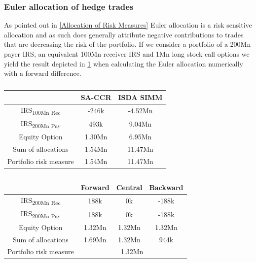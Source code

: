 \documentclass[../Thesis_AHoecherl.tex]{subfiles}
\begin{document}
    \subsubsection{Euler allocation of hedge trades}

    As pointed out in \ref{Allocation of Risk Measures} Euler allocation is a risk sensitive allocation and as such does generally attribute negative contributions to trades that are decreasing the risk of the portfolio. If we consider a portfolio of a 200Mn payer IRS, an equivalent 100Mn receiver IRS and 1Mn long stock call options we yield the result depicted in \ref{tab:hedge trade sample results} when calculating the Euler allocation numerically with a forward difference.

    \begin{table}[htbp]
        \label{tab:hedge trade sample results}
        \centering
            \begin{tabular}{c|c|c}
                & SA-CCR & ISDA SIMM \\
                \toprule
                IRS\textsubscript{100Mn Rec} & -246k & -4.52Mn \\
                \midrule
                IRS\textsubscript{200Mn Pay} & 493k & 9.04Mn \\
                \midrule
                Equity Option & 1.30Mn & 6.95Mn \\
                \bottomrule
                Sum of allocations & 1.54Mn & 11.47Mn \\
                \midrule
                Portfolio risk measure & 1.54Mn & 11.47Mn \\
            \end{tabular}%
        \caption{}
    \end{table}

    \begin{table}[htbp]
        \label{tab:EAD perfect hedge}
        \centering
            \begin{tabular}{c|c|c|c}
                & Forward & Central & Backward \\
                \toprule
                IRS\textsubscript{200Mn Rec} & 188k & 0k & -188k \\
                \midrule
                IRS\textsubscript{200Mn Pay} & 188k & 0k & -188k\\
                \midrule
                Equity Option & 1.32Mn & 1.32Mn & 1.32Mn\\
                \bottomrule
                Sum of allocations & 1.69Mn & 1.32Mn & 944k \\
                \midrule
                Portfolio risk measure & \multicolumn{3}{c}{1.32Mn} \\
            \end{tabular}%
        \caption{}
    \end{table}
\end{document}
